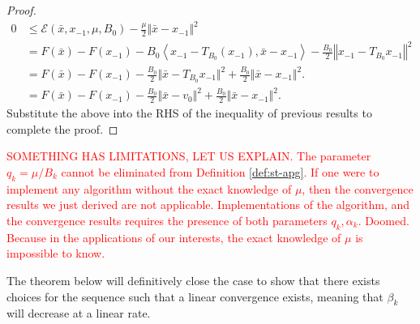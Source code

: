 \documentclass[12pt]{article}
\begin{document}
\begin{proof}
                \begin{align*}
                    0 &\le \mathcal E(\bar x, x_{-1}, \mu, B_0) - \frac{\mu}{2}\Vert \bar x - x_{-1}\Vert^2
                    \\
                    &=
                    F(\bar x) - F(x_{-1}) 
                    - B_0\left\langle x_{-1} - T_{B_0}(x_{-1}), \bar x - x_{-1} \right\rangle
                    - \frac{B_0}{2}\left\Vert x_{-1} - T_{B_0}x_{-1}\right\Vert^2
                    \\
                    &= 
                    F(\bar x) - F(x_{-1}) 
                    - \frac{B_0}{2}\Vert \bar x - T_{B_0}x_{-1}\Vert^2 
                    + \frac{B_0}{2}\Vert \bar x - x_{-1}\Vert^2. 
                    \\
                    &= F(\bar x) - F(x_{-1}) 
                    - \frac{B_0}{2}\Vert \bar x - v_0\Vert^2 
                    + \frac{B_0}{2}\Vert \bar x - x_{-1}\Vert^2. 
                \end{align*}
                Substitute the above into the RHS of the inequality of previous results to complete the proof. 
            \end{proof}
            \par
            \textcolor{red}{
                SOMETHING HAS LIMITATIONS, LET US EXPLAIN.
                The parameter $q_k = \mu/B_k$ cannot be eliminated from Definition \ref{def:st-apg}. 
                If one were to implement any algorithm without the exact knowledge of $\mu$, then the convergence results we just derived are not applicable. 
                Implementations of the algorithm, and the convergence results requires the presence of both parameters $q_k, \alpha_k$. 
                Doomed. 
                Because in the applications of our interests, the exact knowledge of $\mu$ is impossible to know. 
            }
            \par
            The theorem below will definitively close the case to show that there exists choices for the sequence such that a linear convergence exists, meaning that $\beta_k$ will decrease at a linear rate. 
\end{document}
